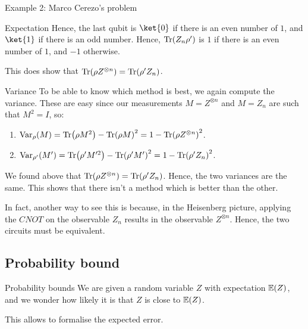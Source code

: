 \documentclass[a4paper]{article}
\begin{document}
\begin{parag}{Example 2: Marco Cerezo's problem}
\begin{subparag}{Expectation}
        Hence, the last qubit is $\ket{0}$ if there is an even number of $1$, and $\ket{1}$ if there is an odd number. Hence, $\Tr\left(Z_n \rho'\right)$ is $1$ if there is an even number of $1$, and $-1$ otherwise.

        This does show that $\Tr\left(\rho Z^{\otimes n}\right) = \Tr\left(\rho' Z_n\right)$.
    \end{subparag}

    \begin{subparag}{Variance}
        To be able to know which method is best, we again compute the variance. These are easy since our measurements $M = Z^{\otimes n}$ and $M = Z_n$ are such that $M^2 = I$, so:
        \begin{enumerate}[left=0pt]
            \item $\Var_{\rho}\left(M\right) = \Tr\left(\rho M^2\right) - \Tr\left(\rho M\right)^2 = 1 - \Tr\left(\rho Z^{\otimes n}\right)^2$.
            \item $\Var_{\rho'}\left(M'\right) = \Tr\left(\rho' M'^2\right) - \Tr\left(\rho' M'\right)^2 = 1 - \Tr\left(\rho' Z_n\right)^2$. 
        \end{enumerate}

        We found above that $\Tr\left(\rho Z^{\otimes n}\right) = \Tr\left(\rho' Z_n\right)$. Hence, the two variances are the same. This shows that there isn't a method which is better than the other.

        In fact, another way to see this is because, in the Heisenberg picture, applying the $CNOT$ on the observable $Z_n$ results in the observable $Z^{\otimes n}$. Hence, the two circuits must be equivalent.
    \end{subparag}
\end{parag}

\subsection{Probability bound}

\begin{parag}{Probability bounds}
    We are given a random variable $Z$ with expectation $\exval\left(Z\right)$, and we wonder how likely it is that $Z$ is close to $\exval\left(Z\right)$.

    This allows to formalise the expected error.
\end{parag}
\end{document}
